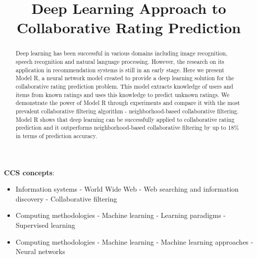 \documentclass[sigconf]{acmart}
\title{Deep Learning Approach to Collaborative Rating Prediction}
\begin{document}
\begin{abstract}
	Deep learning has been successful in various domains 
	including image recognition, speech recognition and natural language 
	processing.
	However, the research on its application in recommendation systems is 
	still in an early stage.
	Here we present Model R, a neural network model created to provide a deep 
	learning solution for the collaborative rating prediction problem.
	This model extracts knowledge of users and items from known ratings and 
	uses this knowledge to predict unknown ratings.
	We demonstrate the power of Model R through experiments and compare it with 
	the most prevalent collaborative filtering algorithm - neighborhood-based 
	collaborative filtering.
	Model R shows that deep learning can be successfully applied to 
	collaborative rating prediction and it outperforms neighborhood-based 
	collaborative filtering by up to 18\% in terms of prediction accuracy.
\end{abstract}

\maketitle

\textbf{CCS concepts}:

\begin{itemize}
	\item Information systems - World Wide Web - Web searching and information discovery - Collaborative filtering
	\item Computing methodologies - Machine learning - Learning paradigms - Supervised learning
	\item Computing methodologies - Machine learning - Machine learning approaches - Neural networks
\end{itemize}
\end{document}
